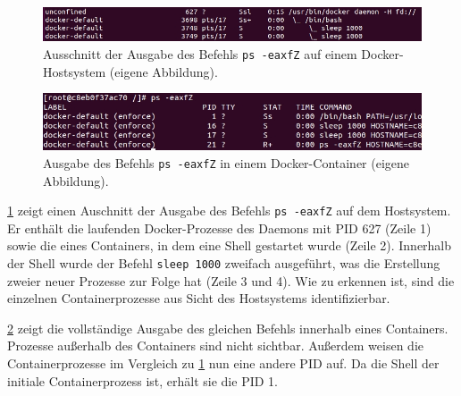 \documentclass[../main.tex]{subfiles}
\begin{document}
			\begin{figure}[h]
					\centering
					\includegraphics[width=1.0\textwidth]{./images/sec_pidNsHost.jpg}
					\caption{Ausschnitt der Ausgabe des Befehls \texttt{ps -eaxfZ} auf einem Docker-Hostsystem (eigene Abbildung).}
					\label{fig:sec_pidNsHost}
			\end{figure}

			\begin{figure}[h]
					\centering
					\includegraphics[width=1.0\textwidth]{./images/sec_pidNsContainer.jpg}
					\caption{Ausgabe des Befehls \texttt{ps -eaxfZ} in einem Docker-Container (eigene Abbildung).}
					\label{fig:sec_pidNsContainer}
			\end{figure}

			\fig \ref{fig:sec_pidNsHost} zeigt einen Auschnitt der Ausgabe des Befehls \texttt{ps -eaxfZ} auf dem Hostsystem. Er enthält die laufenden Docker-Prozesse des Daemons mit PID 627 (Zeile 1) sowie die eines Containers, in dem eine Shell gestartet wurde (Zeile 2). Innerhalb der Shell wurde der Befehl \texttt{sleep 1000} zweifach ausgeführt, was die Erstellung zweier neuer Prozesse zur Folge hat (Zeile 3 und 4). Wie zu erkennen ist, sind die einzelnen Containerprozesse aus Sicht des Hostsystems identifizierbar.


			\fig \ref{fig:sec_pidNsContainer} zeigt die vollständige Ausgabe des gleichen Befehls innerhalb eines Containers. Prozesse außerhalb des Containers sind nicht sichtbar. Außerdem weisen die Containerprozesse im Vergleich zu \fig \ref{fig:sec_pidNsHost} nun eine andere PID auf. Da die Shell der initiale Containerprozess ist, erhält sie die PID 1.

\end{document}
